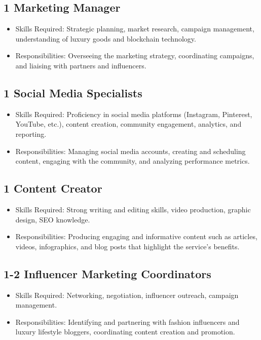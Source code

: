 \documentclass{tufte-handout}
\begin{document}
\subsection{1 Marketing Manager}\label{sec:page-layout}
\begin{itemize}
    \item Skills Required: Strategic planning, market research, campaign management, understanding of luxury goods and blockchain technology.
    \item Responsibilities: Overseeing the marketing strategy, coordinating campaigns, and liaising with partners and influencers.
\end{itemize}
\subsection{1 Social Media Specialists}\label{sec:page-layout}
\begin{itemize}
    \item Skills Required: Proficiency in social media platforms (Instagram, Pinterest, YouTube, etc.), content creation, community engagement,
    analytics, and reporting.
    \item Responsibilities: Managing social media accounts, creating and scheduling content, engaging with the community, and analyzing performance metrics.
\end{itemize}
\subsection{1 Content Creator}\label{sec:page-layout}
\begin{itemize}
    \item Skills Required: Strong writing and editing skills, video production, graphic design, SEO knowledge.
    \item Responsibilities: Producing engaging and informative content such as articles, videos, infographics, and blog posts that highlight the service's benefits.
\end{itemize}
\subsection{1-2 Influencer Marketing Coordinators}\label{sec:page-layout}
\begin{itemize}
    \item Skills Required: Networking, negotiation, influencer outreach, campaign management.
    \item Responsibilities: Identifying and partnering with fashion influencers and luxury lifestyle bloggers, coordinating content creation and promotion.
\end{itemize}
\end{document}

